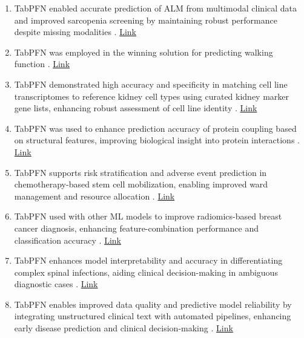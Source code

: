 \begin{enumerate}
\item TabPFN enabled accurate prediction of ALM from multimodal clinical data and improved sarcopenia screening by maintaining robust performance despite missing modalities \cite{kita2026transformerbased}. \href{https://doi.org/10.1186/s12967-026-08079-0}{Link}

\item TabPFN was employed in the winning solution for predicting walking function \cite{villines2026asia}. \href{https://doi.org/10.46292/sci25-00137}{Link}

\item TabPFN demonstrated high accuracy and specificity in matching cell line transcriptomes to reference kidney cell types using curated kidney marker gene lists, enhancing robust assessment of cell line identity \cite{Schoberth2026.03.30.715265}. \href{https://doi.org/10.64898/2026.03.30.715265}{Link}

\item TabPFN was used to enhance prediction accuracy of protein coupling based on structural features, improving biological insight into protein interactions \cite{Pasquale2026.03.07.710286}. \href{https://www.biorxiv.org/content/10.64898/2026.03.07.710286v1}{Link}

\item TabPFN supports risk stratification and adverse event prediction in chemotherapy-based stem cell mobilization, enabling improved ward management and resource allocation \cite{schwarz2026predicting}. \href{https://www.nature.com/articles/s41746-026-02394-y}{Link}

\item TabPFN used with other ML models to improve radiomics-based breast cancer diagnosis, enhancing feature-combination performance and classification accuracy \cite{daniels2026application}. \href{https://www.nature.com/articles/s41598-026-40472-z}{Link}

\item TabPFN enhances model interpretability and accuracy in differentiating complex spinal infections, aiding clinical decision-making in ambiguous diagnostic cases \cite{githubGitHubSmallriver2024STBNet}. \href{https://github.com/Smallriver2024/STBNet}{Link}

\item TabPFN enables improved data quality and predictive model reliability by integrating unstructured clinical text with automated pipelines, enhancing early disease prediction and clinical decision-making \cite{domingoaldama2026automatingearlydiseaseprediction}. \href{http://arxiv.org/abs/2603.28167}{Link}


\end{enumerate}
